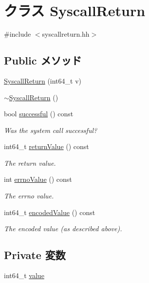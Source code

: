 \hypertarget{classSyscallReturn}{
\section{クラス SyscallReturn}
\label{classSyscallReturn}
}


{\ttfamily \#include $<$syscallreturn.hh$>$}\subsection*{Public メソッド}
\begin{DoxyCompactItemize}
\item 
\hyperlink{classSyscallReturn_a7fdded1828c9eb76cd086f4f55f38da8}{SyscallReturn} (int64\_\-t v)
\item 
\hyperlink{classSyscallReturn_a997bdb2ede937063f361964236058fb0}{$\sim$SyscallReturn} ()
\item 
bool \hyperlink{classSyscallReturn_a4a56e02db533279e0c23d6010779933e}{successful} () const 
\begin{DoxyCompactList}\small\item\em Was the system call successful? \item\end{DoxyCompactList}\item 
int64\_\-t \hyperlink{classSyscallReturn_ab1977b33a1e2019fef23edea0d7e6f2b}{returnValue} () const 
\begin{DoxyCompactList}\small\item\em The return value. \item\end{DoxyCompactList}\item 
int \hyperlink{classSyscallReturn_a0d37ad312e6fa6704e35c2008d21ec0a}{errnoValue} () const 
\begin{DoxyCompactList}\small\item\em The errno value. \item\end{DoxyCompactList}\item 
int64\_\-t \hyperlink{classSyscallReturn_a57588b532e202b278d875d4e4b1f0e9b}{encodedValue} () const 
\begin{DoxyCompactList}\small\item\em The encoded value (as described above). \item\end{DoxyCompactList}\end{DoxyCompactItemize}
\subsection*{Private 変数}
\begin{DoxyCompactItemize}
\item 
int64\_\-t \hyperlink{classSyscallReturn_ac072af30c4ffbc834bb4c681f6ecb514}{value}
\end{DoxyCompactItemize}



